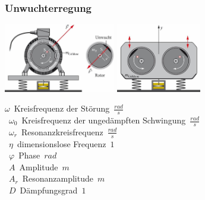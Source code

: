 \subsubsection{Unwuchterregung}
\begin{center}
	\begin{minipage}{0.25\textwidth}
	\end{minipage}%
	\begin{minipage}{0.25\textwidth}
		\includegraphics[height=3cm,center,keepaspectratio=true]{Images/unwuchterregung.png}
		\includegraphics[height=3cm,center,keepaspectratio=true]{Images/unwuchterregung_doppelt.png}
	\end{minipage}
\end{center}

\unit{$\omega$}{Kreisfrequenz der Störung}{$\frac{rad}{s}$} \\
\unit{$\omega_0$}{Kreisfrequenz der ungedämpften Schwingung}{$\frac{rad}{s}$} \\
\unit{$\omega_r$}{Resonanzkreisfrequenz}{$\frac{rad}{s}$} \\
\unit{$\eta$}{dimensionslose Frequenz}{$1$} \\
\unit{$\varphi$}{Phase}{$rad$} \\
\unit{$A$}{Amplitude}{$m$} \\
\unit{$A_r$}{Resonanzamplitude}{$m$} \\
\unit{$D$}{Dämpfungsgrad}{$1$} \\


